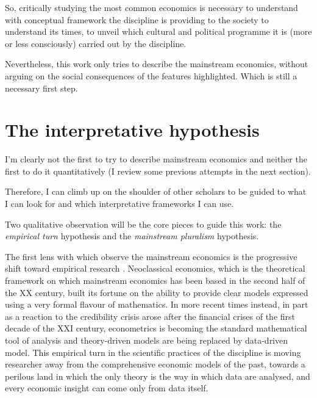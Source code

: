 \documentclass[a4paper, headings=standardclasses]{scrartcl}
\begin{document}
So, critically studying the most common economics is necessary to understand with conceptual framework the discipline is providing to the society to understand its times, to unveil which cultural and political programme it is (more or less consciously) carried out by the discipline.

Nevertheless, this work only tries to describe the mainstream economics, without arguing on the social consequences of the features highlighted. Which is still a necessary first step.

\section{The interpretative hypothesis}
I'm clearly not the first to try to describe mainstream economics and neither the first to do it quantitatively (I review some previous attempts in the next section).

Therefore, I can climb up on the shoulder of other scholars to be guided to what I can look for and which interpretative frameworks I can use.

Two qualitative observation will be the core pieces to guide this work: the \textit{empirical turn} hypothesis and the \textit{mainstream pluralism} hypothesis.

The first lens with which observe the mainstream economics is the progressive shift toward empirical research \parencite{backhouse2000,backhouse2016,backhouse2017,cherrier2022}.
Neoclassical economics, which is the theoretical framework on which mainstream economics has been based in the second half of the XX century, built its fortune on the ability to provide clear models expressed using a very formal flavour of mathematics.
In more recent times instead, in part as a reaction to the credibility crisis arose after the financial crises of the first decade of the XXI century, econometrics is becoming the standard mathematical tool of analysis and theory-driven models are being replaced by data-driven model.
This empirical turn in the scientific practices of the discipline is moving researcher away from the comprehensive economic models of the past, towards a perilous land in which the only theory is the way in which data are analysed, and every economic insight can come only from data itself.
\end{document}

